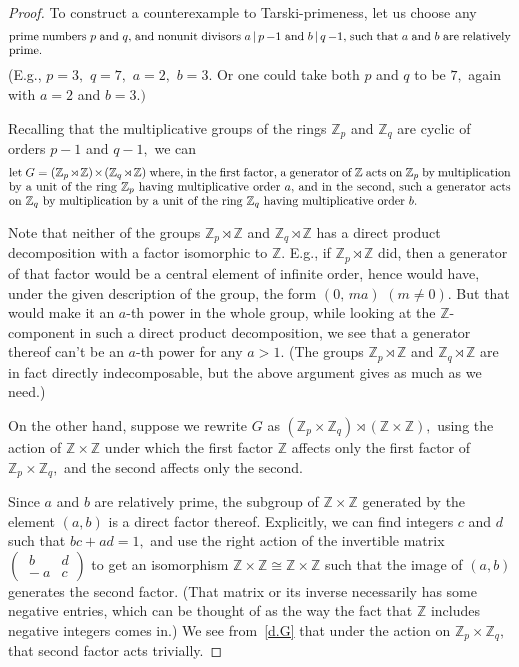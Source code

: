 \documentclass{amsart}
\numberwithin{equation}{section}
\numberwithin{theorem}{section}
\newcommand{\Z}{\mathbb{Z}}
\begin{document}
\begin{proof}
To construct a counterexample to Tarski-primeness, let us choose any
%
\begin{equation}\begin{minipage}[c]{35pc}\label{d.p,q}
prime numbers $p$ and $q,$ and nonunit divisors $a\,|\,p\,{-}1$
and $b\,|\,q\,{-}1,$ such that $a$ and $b$ are relatively prime.
\end{minipage}\end{equation}
%
(E.g., $p=3,$ $q=7,$ $a=2,$ $b=3.$
Or one could take both $p$ and $q$ to be $7,$
again with $a=2$ and $b=3.)$

Recalling that the multiplicative groups of the rings
$\Z_p$ and $\Z_q$ are cyclic of orders $p-1$ and $q-1,$ we can
%
\begin{equation}\begin{minipage}[c]{35pc}\label{d.G}
let $G=(\Z_p\rtimes\Z)\times(\Z_q\rtimes\Z)$ where, in the first
factor, a generator of $\Z$ acts on $\Z_p$ by multiplication by
a unit of the ring $\Z_p$ having multiplicative order $a,$
and in the second, such a generator acts on $\Z_q$ by multiplication by
a unit of the ring $\Z_q$ having multiplicative order $b.$
\end{minipage}\end{equation}

Note that neither of the groups $\Z_p\rtimes\Z$ and $\Z_q\rtimes\Z$
has a direct product decomposition with a factor isomorphic to $\Z.$
E.g., if $\Z_p\rtimes\Z$ did, then a generator of that
factor would be a central element of infinite order, hence
would have, under the given description of the group,
the form $(0,\,ma)$ $(m\neq 0).$
But that would make it an $\!a\!$-th power in the whole
group, while looking at the $\!\Z\!$-component in such a direct
product decomposition, we see that a generator thereof can't be an
$\!a\!$-th power for any $a>1.$
(The groups $\Z_p\rtimes\Z$ and $\Z_q\rtimes\Z$ are
in fact directly indecomposable, but the above argument
gives as much as we need.)

On the other hand, suppose we
rewrite $G$ as $(\Z_p\times\Z_q)\rtimes(\Z\times\Z),$
using the action of $\Z\times\Z$ under which the first factor $\Z$
affects only the first factor of $\Z_p\times\Z_q,$ and the second
affects only the second.

Since $a$ and $b$ are relatively prime,
the subgroup of $\Z\times\Z$ generated by the element $(a,b)$
is a direct factor thereof.
Explicitly, we can find integers $c$ and $d$ such that $bc+ad=1,$
and use the right action of the invertible matrix
$(\begin{smallmatrix} \ b & d \\ \!\!-a & c \end{smallmatrix})$
to get an isomorphism $\Z\times\Z\cong\Z\times\Z$ such that
the image of $(a,b)$ generates the second factor.
(That matrix or its inverse necessarily has
some negative entries, which can be thought of as the way
the fact that $\Z$ includes negative integers comes in.)
We see from~\eqref{d.G} that under the action
on $\Z_p\times\Z_q,$ that second factor acts trivially.


\end{proof}
\end{document}
